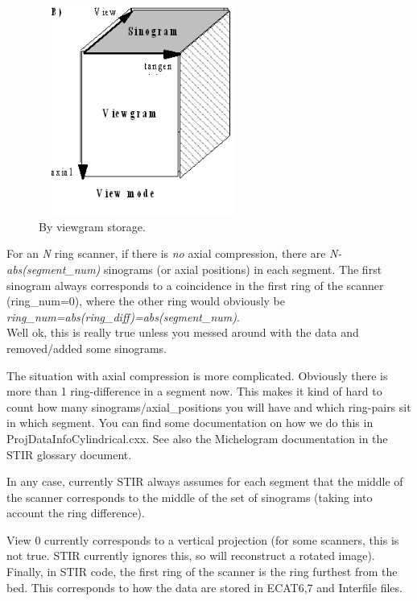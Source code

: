 \documentclass{article}
\begin{document}
\begin{figure}[htbp]
\begin{center}
\includegraphics[width=2.7in, height=2.7in]{graphics/STIR-developers-overviewFig4}
\caption{By viewgram storage.}
\label{fig:viewgramstorage}
\end{center}
\end{figure}


For an \textit{N} ring scanner, if there is \textit{no} axial compression, 
there are \textit{N-abs(segment\_num)}  sinograms (or axial positions) 
in each segment. The first sinogram always corresponds to a coincidence 
in the first ring of the scanner (ring\_num=0), where the other 
ring would obviously be \textit{ring\_num=abs(ring\_diff)=abs(segment\_num)}. 
\\
Well ok, this is really true unless you messed around with the 
data and removed/added some sinograms. 

The situation with axial compression is more complicated. 
Obviously there is more than 1 ring-difference in a segment now. 
This makes it kind of hard to count how many sinograms/axial\_positions 
you will have and which ring-pairs sit in which segment. You 
can find some documentation on how we do this in ProjDataInfoCylindrical.cxx. 
See also the Michelogram documentation in the STIR glossary document. 


In any case, currently STIR always assumes for each segment that 
the middle of the scanner corresponds to the middle of the set 
of sinograms (taking into account the ring difference). 

View 0 currently corresponds to a vertical projection (for some 
scanners, this is not true. STIR currently ignores this, so will 
reconstruct a rotated image). Finally, in STIR code, the first 
ring of the scanner is the ring furthest from the bed. This corresponds 
to how the data are stored in ECAT6,7 and Interfile files.
\end{document}
